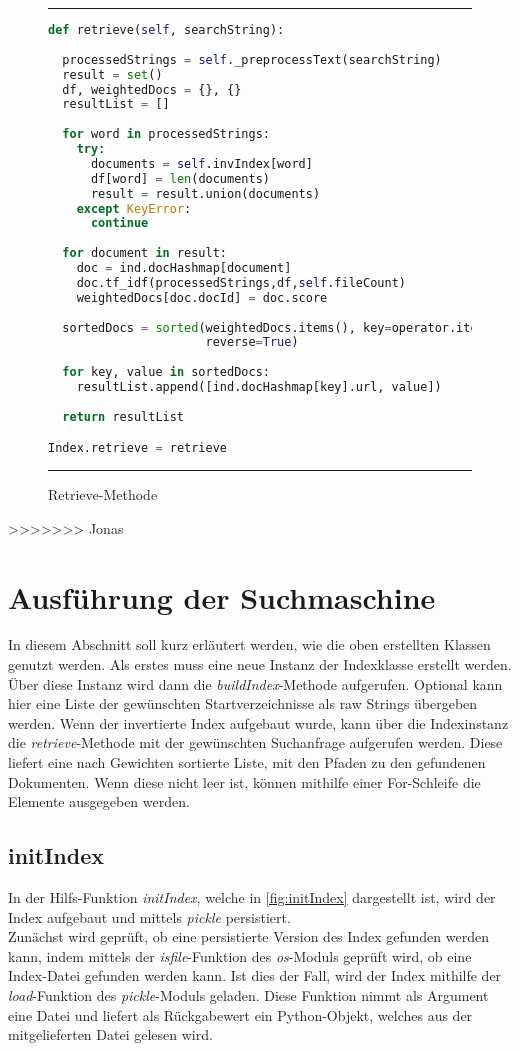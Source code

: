 \begin{figure}
	\rule{\textwidth}{0.4pt}
		\begin{lstlisting}[language=Python]
def retrieve(self, searchString):
 
  processedStrings = self._preprocessText(searchString)
  result = set()
  df, weightedDocs = {}, {}
  resultList = []
    
  for word in processedStrings:
    try:
      documents = self.invIndex[word]
      df[word] = len(documents)
      result = result.union(documents)
    except KeyError:
      continue
    
  for document in result:
    doc = ind.docHashmap[document]
    doc.tf_idf(processedStrings,df,self.fileCount)
    weightedDocs[doc.docId] = doc.score
        
  sortedDocs = sorted(weightedDocs.items(), key=operator.itemgetter(1),
                      reverse=True)
    
  for key, value in sortedDocs:
    resultList.append([ind.docHashmap[key].url, value])
        
  return resultList

Index.retrieve = retrieve
		\end{lstlisting}
	\rule{\textwidth}{0.4pt}
	\caption{Retrieve-Methode}
	\label{fig:retrieve}
\end{figure}

>>>>>>> Jonas
\section{Ausführung der Suchmaschine}

In diesem Abschnitt soll kurz erläutert werden, wie die oben erstellten Klassen genutzt werden. Als erstes muss eine neue Instanz der Indexklasse erstellt werden. Über diese Instanz wird dann die \textit{buildIndex}-Methode aufgerufen. Optional kann hier eine Liste der gewünschten Startverzeichnisse als raw Strings übergeben werden. Wenn der invertierte Index aufgebaut wurde, kann über die Indexinstanz die \textit{retrieve}-Methode mit der gewünschten Suchanfrage aufgerufen werden. Diese liefert eine nach Gewichten sortierte Liste, mit den Pfaden zu den gefundenen Dokumenten. Wenn diese nicht leer ist, können mithilfe einer For-Schleife die Elemente ausgegeben werden.

\subsection{initIndex}\label{initIndex}
In der Hilfs-Funktion \textit{initIndex}, welche in \ref{fig:initIndex} dargestellt ist, wird der Index aufgebaut und mittels \textit{pickle} persistiert.
\\
Zunächst wird geprüft, ob eine persistierte Version des Index gefunden werden kann, indem mittels der \textit{isfile}-Funktion des \textit{os}-Moduls geprüft wird, ob eine Index-Datei gefunden werden kann.
Ist dies der Fall, wird der Index mithilfe der \textit{load}-Funktion des \textit{pickle}-Moduls geladen. Diese Funktion nimmt als Argument eine Datei und liefert als Rückgabewert ein Python-Objekt, welches aus der mitgelieferten Datei gelesen wird.

